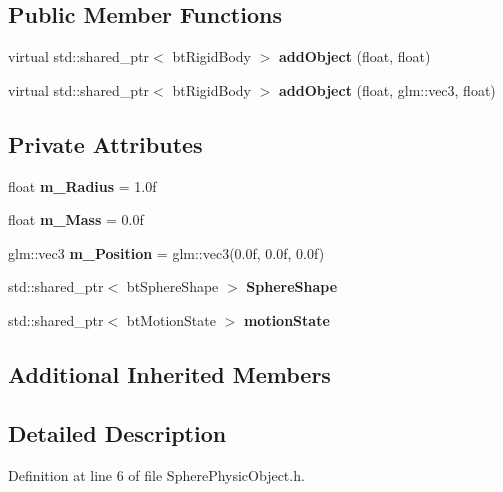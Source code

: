 \subsection*{Public Member Functions}
\begin{DoxyCompactItemize}
\item 
virtual std\+::shared\+\_\+ptr$<$ bt\+Rigid\+Body $>$ {\bfseries add\+Object} (float, float)\hypertarget{class_physics_1_1_sphere_physic_object_acfad3e41c488af19782a04cb14634419}{}\label{class_physics_1_1_sphere_physic_object_acfad3e41c488af19782a04cb14634419}

\item 
virtual std\+::shared\+\_\+ptr$<$ bt\+Rigid\+Body $>$ {\bfseries add\+Object} (float, glm\+::vec3, float)\hypertarget{class_physics_1_1_sphere_physic_object_a589b05706ef56f75bb4fa614469982e9}{}\label{class_physics_1_1_sphere_physic_object_a589b05706ef56f75bb4fa614469982e9}

\end{DoxyCompactItemize}
\subsection*{Private Attributes}
\begin{DoxyCompactItemize}
\item 
float {\bfseries m\+\_\+\+Radius} = 1.\+0f\hypertarget{class_physics_1_1_sphere_physic_object_a581a99b75fb677bbe84f4fb38f60ee4f}{}\label{class_physics_1_1_sphere_physic_object_a581a99b75fb677bbe84f4fb38f60ee4f}

\item 
float {\bfseries m\+\_\+\+Mass} = 0.\+0f\hypertarget{class_physics_1_1_sphere_physic_object_a709fc515e8acb38a85cb83149c183aef}{}\label{class_physics_1_1_sphere_physic_object_a709fc515e8acb38a85cb83149c183aef}

\item 
glm\+::vec3 {\bfseries m\+\_\+\+Position} = glm\+::vec3(0.\+0f, 0.\+0f, 0.\+0f)\hypertarget{class_physics_1_1_sphere_physic_object_aecca83d52fe256526c6e8d8958dedfaf}{}\label{class_physics_1_1_sphere_physic_object_aecca83d52fe256526c6e8d8958dedfaf}

\item 
std\+::shared\+\_\+ptr$<$ bt\+Sphere\+Shape $>$ {\bfseries Sphere\+Shape}\hypertarget{class_physics_1_1_sphere_physic_object_a7d3b9799ae65a5ca8a8a44809e317671}{}\label{class_physics_1_1_sphere_physic_object_a7d3b9799ae65a5ca8a8a44809e317671}

\item 
std\+::shared\+\_\+ptr$<$ bt\+Motion\+State $>$ {\bfseries motion\+State}\hypertarget{class_physics_1_1_sphere_physic_object_a6d8e8ab15acfb31cba17f3b24622aac0}{}\label{class_physics_1_1_sphere_physic_object_a6d8e8ab15acfb31cba17f3b24622aac0}

\end{DoxyCompactItemize}
\subsection*{Additional Inherited Members}


\subsection{Detailed Description}


Definition at line 6 of file Sphere\+Physic\+Object.\+h.

